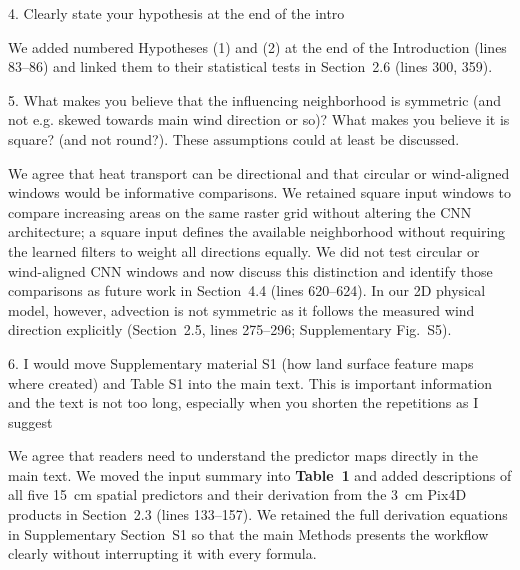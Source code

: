 \documentclass[12pt,english]{reviewresponse}
\begin{document}
\begin{revcomment}
4. Clearly state your hypothesis at the end of the intro
\end{revcomment}

\begin{revresponse}
We added numbered Hypotheses (1) and (2) at the end of the Introduction (lines 83--86) and linked them to their statistical tests in Section~2.6 (lines 300, 359).
\end{revresponse}

\begin{revcomment}
5. What makes you believe that the influencing neighborhood is symmetric (and not e.g. skewed towards main wind direction or so)? What makes you believe it is square? (and not round?). These assumptions could at least be discussed.
\end{revcomment}

\begin{revresponse}
We agree that heat transport can be directional and that circular or wind-aligned windows would be informative comparisons. We retained square input windows to compare increasing areas on the same raster grid without altering the CNN architecture; a square input defines the available neighborhood without requiring the learned filters to weight all directions equally. We did not test circular or wind-aligned CNN windows and now discuss this distinction and identify those comparisons as future work in Section~4.4 (lines 620--624). In our 2D physical model, however, advection is not symmetric as it follows the measured wind direction explicitly (Section~2.5, lines 275--296; Supplementary Fig.~S5).
\end{revresponse}

\begin{revcomment}
6. I would move Supplementary material S1 (how land surface feature maps where created) and Table S1 into the main text. This is important information and the text is not too long, especially when you shorten the repetitions as I suggest
\end{revcomment}

\begin{revresponse}
We agree that readers need to understand the predictor maps directly in the main text. We moved the input summary into \textbf{Table~1} and added descriptions of all five 15~cm spatial predictors and their derivation from the 3~cm Pix4D products in Section~2.3 (lines 133--157). We retained the full derivation equations in Supplementary Section~S1 so that the main Methods presents the workflow clearly without interrupting it with every formula.
\end{revresponse}
\end{document}
